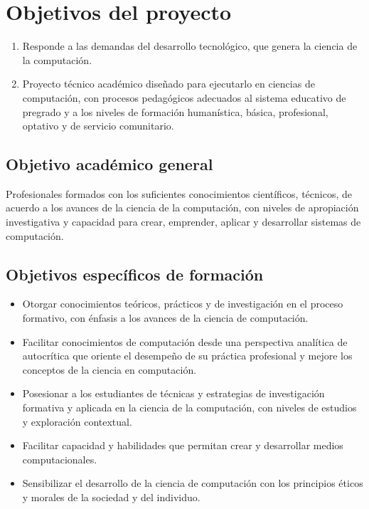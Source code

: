 \section{Objetivos del proyecto}
\begin{enumerate}
\item Responde a las demandas del desarrollo tecnológico, que  genera la ciencia de la computación.

\item Proyecto técnico académico diseñado para ejecutarlo  en ciencias de computación, 
con procesos pedagógicos adecuados al sistema educativo  de pregrado y a los niveles de 
formación  humanística,  básica,  profesional, optativo  y de servicio comunitario.
\end{enumerate}

\subsection{Objetivo académico general}
Profesionales formados con los suficientes  conocimientos  científicos, técnicos, de 
acuerdo a los avances de la  ciencia de la computación, con  niveles de apropiación 
investigativa y capacidad para crear, emprender, aplicar y desarrollar sistemas de computación.

\subsection{Objetivos específicos de formación}
\begin{itemize}
\item Otorgar conocimientos teóricos, prácticos y de investigación en el proceso formativo, 
con énfasis a los avances de la ciencia de  computación.

\item Facilitar conocimientos de  computación desde una perspectiva analítica de autocrítica 
que oriente el desempeño de su práctica profesional y mejore los conceptos  de la 
ciencia en computación.

\item Posesionar a los estudiantes de técnicas y estrategias de investigación 
formativa y aplicada  en la ciencia de la computación, con niveles de estudios 
y exploración contextual.

\item Facilitar capacidad y habilidades  que permitan crear y desarrollar 
medios computacionales.

\item Sensibilizar el desarrollo de la ciencia de computación con los principios 
éticos y morales de la sociedad y del individuo.
\end{itemize}